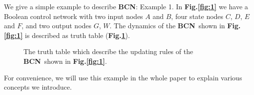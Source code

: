 \documentclass[letterpaper, 10 pt, conference]{ieeeconf}  %
\def \BCN {{\bf BCN}}
\begin{document}
We give a simple example to describe {\bf BCN}: Example 1. In {\bf Fig.\ref{fig:1}} we have a Boolean control network with two input nodes $A$ and $B$, four state nodes $C$, $D$, $E$ and $F$, and two output nodes $G$, $W$. The dynamics of the \BCN\ shown in {\bf Fig.\ref{fig:1}} is described as truth table ({\bf Fig.\ref{fig:2}}).
  \begin{figure}[thpb]
      \centering
      
      \caption{The truth table which describe the updating rules of the \BCN\ shown in {\bf Fig.\ref{fig:1}}.}
      \label{fig:2}
   \end{figure}   
For convenience, we will use this example in the whole paper to explain various concepts we introduce.
\end{document}
